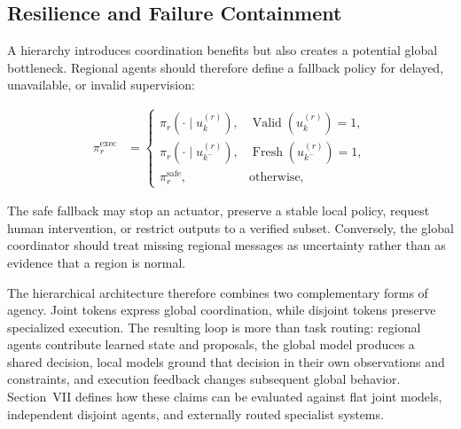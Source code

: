 \subsection{\textbf{Resilience and Failure Containment}}

A hierarchy introduces coordination benefits but also creates a potential global bottleneck. Regional agents should therefore define a fallback policy for delayed, unavailable, or invalid supervision:

\begin{equation}
\begin{aligned}
    \pi_r^{\mathrm{exec}}
    &=
    \begin{cases}
       \pi_r(\cdot\mid u_k^{(r)}),
       &\operatorname{Valid}(u_k^{(r)})=1,\\
       \pi_r(\cdot\mid u_{k^-}^{(r)}),
       &\operatorname{Fresh}(u_{k^-}^{(r)})=1,\\
       \pi_r^{\mathrm{safe}},
       &\text{otherwise},
    \end{cases}
\end{aligned}
\label{eq:regional_fallback}
\end{equation}

The safe fallback may stop an actuator, preserve a stable local policy, request human intervention, or restrict outputs to a verified subset. Conversely, the global coordinator should treat missing regional messages as uncertainty rather than as evidence that a region is normal.

The hierarchical architecture therefore combines two complementary forms of agency. Joint tokens express global coordination, while disjoint tokens preserve specialized execution. The resulting loop is more than task routing: regional agents contribute learned state and proposals, the global model produces a shared decision, local models ground that decision in their own observations and constraints, and execution feedback changes subsequent global behavior. Section~VII defines how these claims can be evaluated against flat joint models, independent disjoint agents, and externally routed specialist systems.
